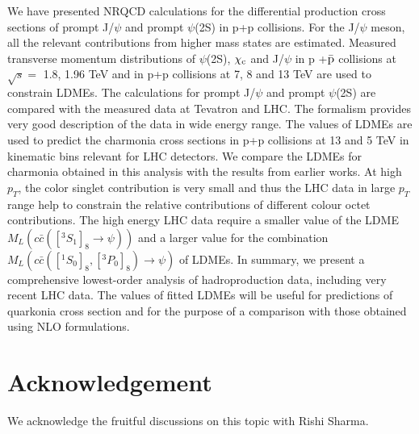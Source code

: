 \documentclass[12pt,a4paper,final]{iopart}
\newcommand{\barc}{{\bar{c}}}
\begin{document}
  We have presented NRQCD calculations for the differential production 
  cross sections of prompt J/$\psi$ and prompt $\psi$(2S) in  p+p collisions.
  For the J/$\psi$ meson, all the relevant contributions from higher mass states 
  are estimated. 
  Measured transverse momentum distributions of $\psi$(2S), $\chi_{\rm c}$ and J/$\psi$ 
  in p +{$\bar {\rm p}$} collisions at $\sqrt{s}=$ 1.8, 1.96 TeV and in p+p collisions at 
  7, 8 and 13 TeV are used to constrain LDMEs. 
  The calculations for  prompt J/$\psi$ and prompt $\psi$(2S) are compared with the measured 
  data at Tevatron and LHC. 
  The formalism provides  very good description of the data in wide energy range. 
  The values of LDMEs are used to predict the charmonia cross sections in p+p collisions 
  at 13 and 5 TeV in kinematic bins relevant for LHC detectors. 
  We compare the LDMEs for charmonia obtained in this analysis with the results from earlier works.
 {\color{black}   
   At high $p_T$, the color singlet contribution is very small and thus the LHC data in large $p_T$ range 
   help to constrain the relative contributions of different colour octet contributions.
   The high energy LHC data require a smaller value of the LDME $M_{L}(c\barc([^3S_1]_{8}\rightarrow \psi))$ 
   and a larger value for the combination  $M_{L}(c\barc([^1S_0]_{8},[^3P_0]_{8})\rightarrow \psi)$ of LDMEs.   
   In summary, we present a comprehensive lowest-order analysis of hadroproduction data, 
   including very recent LHC data. The values of fitted LDMEs will be useful for 
   predictions of quarkonia cross section and for the purpose of a comparison with those 
   obtained using NLO formulations.
 }

\section*{Acknowledgement}
 We acknowledge the fruitful discussions on this topic with Rishi Sharma.
\end{document}

